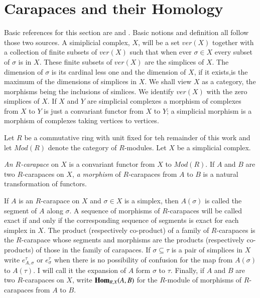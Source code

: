 \section{Carapaces and their Homology}\label{chap6-sec-1}
\pageoriginale

Basic references for this section are \cite{chap6-keyMac} and \cite{chap6-keyGr}. Basic notions and definition all follow those two sources. A simiplicial complex, $X$, will be a set $ver(X)$ together with a collection of finite subsets of $ver(X)$ such that when ever $\sigma \in X$ every subset of $\sigma$ is in $X$. These finite subsets of $ver(X)$ are the simplices of $X$. The dimension of $\sigma $ is its cardinal less one and the dimension of $X$, if it exists,is the maximum of the dimensions of simplices in $X$. We shall view $X$ as a category, the morphisms being the inclusions of simlices. We identify $ver(X)$ with the zero simplices of $X$. If $X$ and $Y$ are simplicial complexes a morphism of complexes from $X$ to $Y$ is just a convariant functor from $X$ to $Y$; a simplicial morphism is a morphism of complexes taking vertices to vertices.

Let $R$ be a commutative ring with unit fixed for teh remainder of this work and let $M od(R)$ denote the category of $R$-modules. Let $X$ be a simplicial complex.

\begin{definition}\label{chap6-def-1.1}
\textit{An $R$-carapace} on $X$ is a convariant functor from $X$ to $M od(R)$. If $A$ and $B$ are two $R$-carapaces on $X$, \textit{a morphism} of $R$-carapaces from $A$ to $B$ is a natural transformation of functors. 
\end{definition}
 If $A$ is an $R$-carapace on $X$ and $\sigma \in X$ is a simplex, then $A(\sigma)$ is called the segment of $A$ along $\sigma$. A sequence of morphisms of $R$-carapaces will be called exact if and only if the corresponding sequence of segments is exact for each simplex in $X$. The product (respectively co-product) of a family of $R$-carapaces is the $R$-carapace whose segments and morphisms are the products (respectively co-products) of those in  the family of carapaces. If $\sigma \subseteq \tau$ is a pair of simplices in $X$ write $e_{A, \sigma}^{\tau}$ or $e_{\sigma}^{\tau}$ when there is no possibility of confusion for the map from $A(\sigma)$ to $A(\tau)$. I will call it the expansion of $A$ form $\sigma$ to $\tau$. Finally, if $A$ and $B$ are two $R$-carapaces on $X$, write $\operatorname{\mathbf{Hom}}_{R, X}(A, B)$ for the $R$-module of morphisms of $R$-carapaces from $A$ to $B$.

